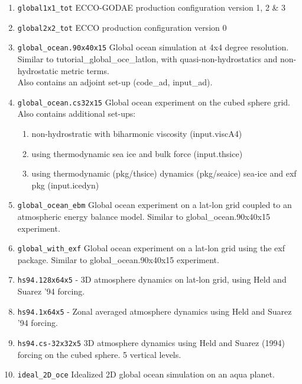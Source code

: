 \begin{enumerate}
\item \texttt{global1x1\_tot} ECCO-GODAE production configuration
 version 1, 2 \& 3

\item \texttt{global2x2\_tot} ECCO production configuration version 0

\item \texttt{global\_ocean.90x40x15} Global ocean simulation at 4x4 
  degree resolution. Similar to tutorial\_global\_oce\_latlon, with
  quasi-non-hydrostatics and non-hydrostatic metric terms.\\
  Also contains an adjoint set-up (code\_ad, input\_ad).

\item \texttt{global\_ocean.cs32x15} Global ocean experiment on the
  cubed sphere grid.\\ 
  Also contains additional set-ups:
  \begin{enumerate}
   \item non-hydrostratic with biharmonic viscosity (input.viscA4)
   \item using thermodynamic sea ice and bulk force (input.thsice)
   \item using thermodynamic (pkg/thsice) dynamics (pkg/seaice) sea-ice
         and exf pkg (input.icedyn)
  \end{enumerate}

\item \texttt{global\_ocean\_ebm} Global ocean experiment on a lat-lon
  grid coupled to an atmospheric energy balance model. Similar to
  global\_ocean.90x40x15 experiment.

\item \texttt{global\_with\_exf} Global ocean experiment on a lat-lon
  grid using the exf package. Similar to global\_ocean.90x40x15
  experiment.

\item \texttt{hs94.128x64x5} - 3D atmosphere dynamics on lat-lon grid,
  using Held and Suarez '94 forcing.
  
\item \texttt{hs94.1x64x5} - Zonal averaged atmosphere dynamics 
  using Held and Suarez '94 forcing.
  
\item \texttt{hs94.cs-32x32x5} 3D atmosphere dynamics using Held and
  Suarez (1994) forcing on the cubed sphere. 5 vertical levels.

\item \texttt{ideal\_2D\_oce} Idealized 2D global ocean simulation on
  an aqua planet.


\end{enumerate}
